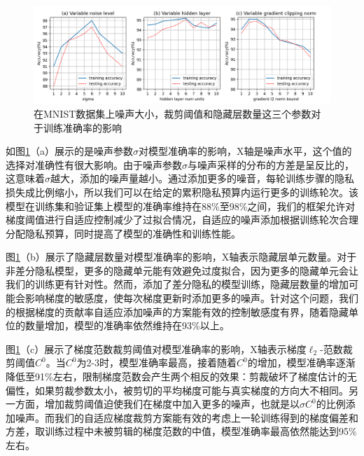 \begin{figure}[!hbt]
\centering
	\includegraphics[scale=0.55]{fig2/C3/第三章实验一}%
	\caption{在MNIST数据集上噪声大小，裁剪阈值和隐藏层数量这三个参数对于训练准确率的影响}
	\label{fig:在MNIST数据集上噪声大小，裁剪阈值和隐藏层数量这三个参数对于训练准确率的影响}	
\end{figure}

如图\ref{fig:在MNIST数据集上噪声大小，裁剪阈值和隐藏层数量这三个参数对于训练准确率的影响}（a）展示的是噪声参数$\sigma$对模型准确率的影响，X轴是噪声水平，这个值的选择对准确性有很大影响。由于噪声参数$\sigma$与噪声采样的分布的方差是呈反比的，这意味着$\sigma$越大，添加的噪声量越小。通过添加更多的噪音，每轮训练步骤的隐私损失成比例缩小，所以我们可以在给定的累积隐私预算内运行更多的训练轮次。该模型在训练集和验证集上模型的准确率维持在88\%至98\%之间，我们的框架允许对梯度阈值进行自适应控制减少了过拟合情况，自适应的噪声添加根据训练轮次合理分配隐私预算，同时提高了模型的准确性和训练性能。

图\ref{fig:在MNIST数据集上噪声大小，裁剪阈值和隐藏层数量这三个参数对于训练准确率的影响}（b）展示了隐藏层数量对模型准确率的影响，X轴表示隐藏层单元数量。对于非差分隐私模型，更多的隐藏单元能有效避免过度拟合，因为更多的隐藏单元会让我们的训练更有针对性。然而，添加了差分隐私的模型训练，隐藏层数量的增加可能会影响梯度的敏感度，使每次梯度更新时添加更多的噪声。针对这个问题，我们的根据梯度的贡献率自适应添加噪声的方案能有效的控制敏感度有界，随着隐藏单位的数量增加，模型的准确率依然维持在93\%以上。

图\ref{fig:在MNIST数据集上噪声大小，裁剪阈值和隐藏层数量这三个参数对于训练准确率的影响}（c）展示了梯度范数裁剪阈值对模型准确率的影响，X轴表示梯度$\ell_{2}$-范数裁剪阈值$C^{0}$。当$C^{0}$为2-3时，模型准确率最高，接着随着$C^{0}$的增加，模型准确率逐渐降低至91\%左右，限制梯度范数会产生两个相反的效果：剪裁破坏了梯度估计的无偏性，如果剪裁参数太小，被剪切的平均梯度可能与真实梯度的方向大不相同。另一方面，增加裁剪阈值迫使我们在梯度中加入更多的噪声，也就是以$\sigma$$C^{0}$的比例添加噪声。而我们的自适应梯度裁剪方案能有效的考虑上一轮训练得到的梯度偏差和方差，取训练过程中未被剪辑的梯度范数的中值，模型准确率最高依然能达到95\%左右。


